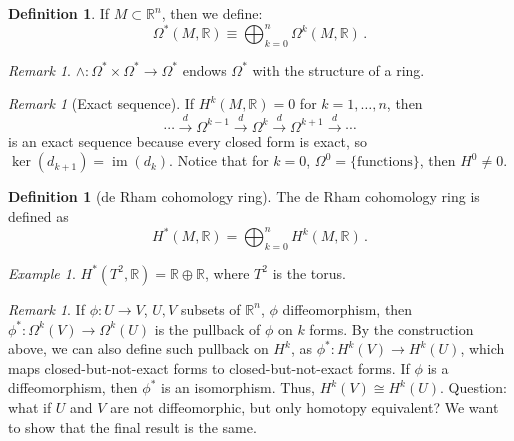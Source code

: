 \documentclass[a4paper,11pt,titlepage, article, oneside]{memoir}
\numberwithin{equation}{section}
\theoremstyle{definition}
\newtheorem{definition}[theorem]{Definition}
\theoremstyle{remark}
\newtheorem{remark}[theorem]{Remark}
\newtheorem{example}[theorem]{Example}
\DeclareMathOperator{\im}{im}
\newcommand{\rfield}{\mathbb{R}}
\begin{document}
\begin{definition}
  If $M \subset \rfield^n$, then we define:
  \[  \Omega^*(M, \rfield) \equiv \bigoplus_{k=0}^n \Omega^k(M, \rfield) \, . \]
\end{definition}

\begin{remarkbox}\begin{remark}
  $\wedge \colon \Omega^* \times \Omega^* \rightarrow \Omega^*$ endows $\Omega^*$ with the structure of a ring.
\end{remark}\end{remarkbox}

\begin{remarkbox}\begin{remark} [Exact sequence] \label{exsequence}
  If $H^k(M, \rfield) = 0$ for $k=1, \ldots, n$, then
    $$\cdots \overset{d}{\longrightarrow} \Omega^{k-1} \overset{d}{\longrightarrow} \Omega^{k} \overset{d}{\longrightarrow} \Omega^{k+1} \overset{d}{\longrightarrow} \cdots $$
    is an exact sequence because every closed form is exact, so $\ker(d_{k+1}) = \im(d_k)$. Notice that for $k=0$, $\Omega^0 = \{\text{functions}\}$, then $H^0 \ne 0$.
\end{remark} \end{remarkbox}

\begin{definition}[de Rham cohomology ring]
  The de Rham cohomology ring is defined as
  \[ H^*(M, \rfield) = \bigoplus_{k=0}^n H^k(M, \rfield) \, .\]
\end{definition}

\begin{tcolorbox}\begin{example}
  $H^*(T^2, \rfield) = \rfield \oplus \rfield$, where $T^2$ is the torus.
\end{example}\end{tcolorbox}

\begin{remarkbox}\begin{remark}
  If $\phi \colon U \rightarrow V$, $U, V$ subsets of $\rfield^n$, $\phi$ diffeomorphism, then $\phi^* \colon \Omega^k(V) \rightarrow \Omega^k(U)$ is the pullback of $\phi$ on $k$ forms. By the construction above, we can also define such pullback on $H^k$, as $\phi^* \colon H^k(V) \rightarrow H^k(U)$, which maps closed-but-not-exact forms to closed-but-not-exact forms.
  If $\phi$ is a diffeomorphism, then $\phi^*$ is an isomorphism. Thus, $H^k(V) \cong H^k(U)$.
  Question: what if $U$ and $V$ are not diffeomorphic, but only homotopy equivalent? We want to show that the final result is the same.
 \end{remark}\end{remarkbox}
\end{document}
